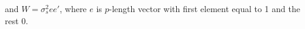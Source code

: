\documentclass{article}
\begin{document}
\noindent and $W = \sigma^2_see'$, where $e$ is $p$-length vector with first element equal to 1 and the rest 0.

%
%
%

\clearpage



\end{document}
